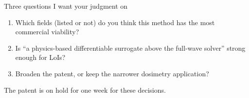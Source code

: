 \documentclass[aspectratio=169, 10pt]{beamer}
\begin{document}

\begin{frame}{Three questions I want your judgment on}
  \vspace{6pt}
  \begin{enumerate}\setlength\itemsep{16pt}
    \item Which fields (listed or not) do you think this method has the most commercial viability?
    \item Is ``a physics-based differentiable surrogate above the full-wave solver'' strong enough for LoIs?
    \item Broaden the patent, or keep the narrower dosimetry application?
  \end{enumerate}
  \vspace{8pt}
  \begin{resultbox}\centering
    The patent is on hold for one week for these decisions.
  \end{resultbox}
\end{frame}
\end{document}
